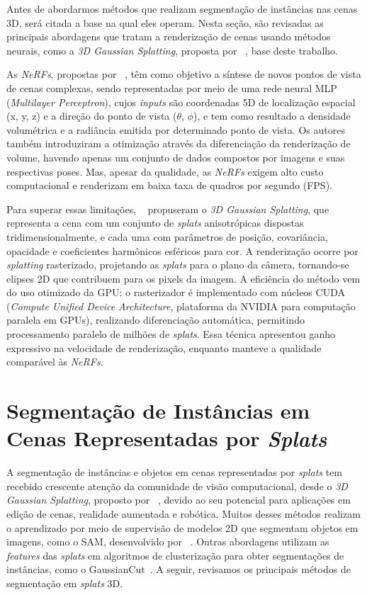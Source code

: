 Antes de abordarmos métodos que realizam segmentação de instâncias nas cenas 3D, será citada a base na qual eles operam. Nesta seção, são revisadas as principais abordagens que tratam a renderização de cenas usando métodos neurais, como a \textit{3D Gaussian Splatting}, proposta por ~\citeauthor{kerbl20233d}, base deste trabalho.

As \textit{NeRFs}, propostas por ~\citeauthor{mildenhall2021nerf}, têm como objetivo a síntese de novos pontos de vista de cenas complexas, sendo representadas por meio de uma rede neural MLP (\textit{Multilayer Perceptron}), cujos \textit{inputs} são coordenadas 5D de localização espacial (x, y, z) e a direção do ponto de vista ($\theta$, $\phi$), e tem como resultado a densidade volumétrica e a radiância emitida por determinado ponto de vista. Os autores também introduziram a otimização através da diferenciação da renderização de volume, havendo apenas um conjunto de dados compostos por imagens e suas respectivas poses. Mas, apesar da qualidade, as \textit{NeRFs} exigem alto custo computacional e renderizam em baixa taxa de quadros por segundo (FPS).

Para superar essas limitações, ~\citeauthor{kerbl20233d} propuseram o \textit{3D Gaussian Splatting}, que representa a cena com um conjunto de \emph{splats} anisotrópicas dispostas tridimensionalmente, e cada uma com parâmetros de posição, covariância, opacidade e coeficientes harmônicos esféricos para cor. A renderização ocorre por \textit{splatting} rasterizado, projetando as \emph{splats} para o plano da câmera, tornando-se elipses 2D que contribuem para os pixels da imagem. A eficiência do método vem do uso otimizado da GPU: o rasterizador é implementado com núcleos CUDA (\textit{Compute Unified Device Architecture}, plataforma da NVIDIA para computação paralela em GPUs), realizando diferenciação automática, permitindo processamento paralelo de milhões de \emph{splats}. Essa técnica apresentou ganho expressivo na velocidade de renderização, enquanto manteve a qualidade comparável às \textit{NeRFs}.

\section{Segmentação de Instâncias em Cenas Representadas por \emph{Splats}}
\label{sec:rev_segmentacao_splats}

A segmentação de instâncias e objetos em cenas representadas por \emph{splats} tem recebido crescente atenção da comunidade de visão computacional, desde o \textit{3D Gaussian Splatting}, proposto por ~\citeauthor{kerbl20233d}, devido ao seu potencial para aplicações em edição de cenas, realidade aumentada e robótica. Muitos desses métodos realizam o aprendizado por meio de supervisão de modelos 2D que segmentam objetos em imagens, como o SAM, desenvolvido por ~\citeauthor{kirillov2023segment}. Outras abordagens utilizam as \textit{features} das \emph{splats} em algoritmos de clusterização para obter segmentações de instâncias, como o GaussianCut~\cite{jain2024gaussiancut}. A seguir, revisamos os principais métodos de segmentação em \emph{splats} 3D.


